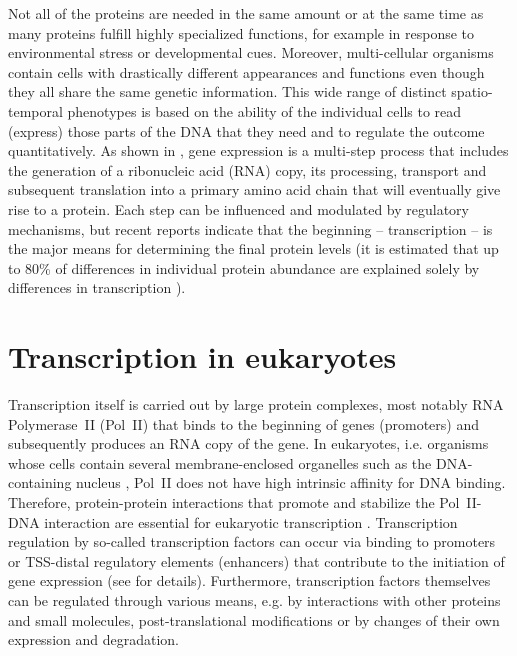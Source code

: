 Not all of the proteins are needed in the same amount or at the same time as many proteins fulfill highly specialized functions, for example in response to environmental stress or developmental cues. Moreover, multi-cellular organisms contain cells with drastically different appearances and functions even though they all share the same genetic information. This wide range of distinct spatio-temporal phenotypes is based on the ability of the individual cells to read (express) those parts of the DNA that they need and to regulate the outcome quantitatively. As shown in , gene expression is a multi-step process that includes the generation of a ribonucleic acid (RNA) copy, its processing, transport and subsequent translation into a primary amino acid chain that will eventually give rise to a protein. Each step can be influenced and modulated by regulatory mechanisms, but recent reports indicate that the beginning -- transcription -- is the major means for determining the final protein levels (it is estimated that up to 80\% of differences in individual protein abundance are explained solely by differences in transcription \citep{Li2014}).
\section{Transcription in eukaryotes}
Transcription itself is carried out by large protein complexes, most notably RNA Polymerase~II (Pol~II) that binds to the beginning of genes (promoters) and subsequently produces an RNA copy of the gene. In eukaryotes, i.e. organisms whose cells contain several membrane-enclosed organelles such as the DNA-containing nucleus \citep{Campbell2003b}, Pol~II does not have high intrinsic affinity for DNA binding. Therefore, protein-protein interactions that promote and stabilize the Pol~II-DNA interaction are essential for eukaryotic transcription \citep{Genomes2002}. Transcription regulation by so-called transcription factors can occur via binding to promoters or TSS-distal regulatory elements (enhancers) that contribute to the initiation of gene expression (see  for details). Furthermore, transcription factors themselves can be regulated through various means, e.g. by interactions with other proteins and small molecules, post-translational modifications or by changes of their own expression and degradation. 
%
